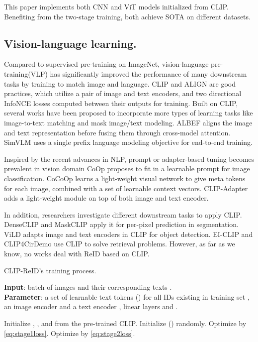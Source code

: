 \documentclass[letterpaper]{article} \usepackage{aaai23}  \usepackage{times}  \usepackage{helvet}  \usepackage{courier}  \usepackage[hyphens]{url}  \usepackage{graphicx} \urlstyle{rm} \def\UrlFont{\rm}  \usepackage{natbib}  \usepackage{caption} \frenchspacing  \setlength{\pdfpagewidth}{8.5in}  \setlength{\pdfpageheight}{11in}  \usepackage{algorithm}
\begin{document}
This paper implements both CNN and ViT models initialized from CLIP. Benefiting from the two-stage training, both achieve SOTA on different datasets. 

\subsection{Vision-language learning.} Compared to supervised pre-training on ImageNet, vision-language pre-training(VLP) has significantly improved the performance of many downstream tasks by training to match image and language. CLIP \cite{CLIP} and ALIGN \cite{ALIGN} are good practices, which utilize a pair of image and text encoders, and two directional InfoNCE losses computed between their outputs for training. Built on CLIP, several works \cite{li2022blip, ViLT} have been proposed to incorporate more types of learning tasks like image-to-text matching and mask image/text modeling. ALBEF \cite{ALBEF} aligns the image and text representation before fusing them through cross-model attention. SimVLM \cite{SIMVLM} uses a single prefix language modeling objective for end-to-end training. 

Inspired by the recent advances in NLP, prompt or adapter-based tuning becomes prevalent in vision domain
CoOp \cite{CoOP} proposes to fit in a learnable prompt for image classification. CoCoOp \cite{CoCoOp} learns a light-weight visual network to give meta tokens for each image, combined with a set of learnable context vectors. CLIP-Adapter \cite{CLIP-Adapter} adds a light-weight module on top of both image and text encoder.

In addition, researchers investigate different downstream tasks to apply CLIP. DenseCLIP \cite{rao2022denseclip} and MaskCLIP \cite{zhou2021denseclip} apply it for per-pixel prediction in segmentation. ViLD \cite{gu2021open} adapts image and text encoders in CLIP for object detection. EI-CLIP \cite{EL-CLIP} and CLIP4CirDemo \cite{CLIP4CirDemo} use CLIP to solve retrieval problems. However, as far as we know, no works deal with ReID based on CLIP.




\begin{algorithm}[t]
\caption{CLIP-ReID's training process.}
\label{alg:algorithm}
\textbf{Input}: batch of images  and their corresponding texts .\\
\textbf{Parameter}: a set of learnable text tokens () for all IDs existing in training set , an image encoder  and a text encoder , linear layers  and .

\begin{algorithmic}[1] \STATE Initialize , ,  and  from the pre-trained CLIP. Initialize () randomly.
    \STATE 
    \STATE Optimize   by \cref{eq:stage1loss}.
\ENDWHILE
{}
    \STATE  
\ENDFOR
{}
    \STATE 
    \STATE Optimize  by \cref{eq:stage2loss}.
\ENDWHILE
\end{algorithmic}
\end{algorithm}
\end{document}
